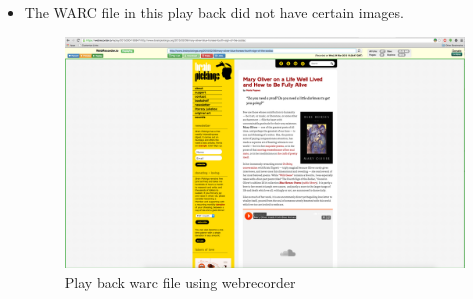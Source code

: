 \begin{itemize}
\begin{figure}
\begin{center}
			  \end{center}
		  \end{figure}	
	 \item The WARC file in this play back did not have certain images.
		  \begin{figure}
		  	 \begin{center}
		  	 		\includegraphics[scale=0.40]{webrecorderplayback2.png}
		  	 		\caption{Play back warc file using webrecorder}
			  \end{center}
		  \end{figure}	
	
\end{itemize}
\newpage
